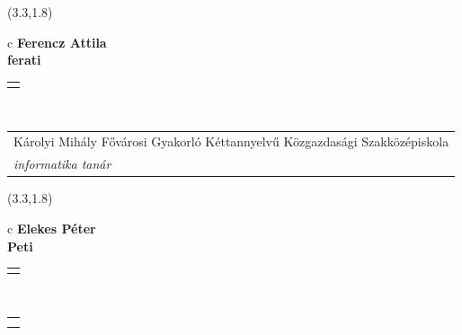 \documentclass[11pt]{article}
\begin{document}
\makebox(3.3,1.8){
  \renewcommand\arraystretch{1.3}
  \begin{tabular}[c]{c}
    \hspace{8.5mm}
    \LARGE\bf{ Ferencz Attila }\\
    \hspace{8.5mm}
    \Large{ ferati }\\
    \renewcommand\arraystretch{3}
    \begin{tabular}[c]{c}
      \centering
      \fontfamily{phv}\selectfont{
        \textbf{
          \textsc{
            \scriptsize{
            \color{Bright}{ Ismerkedő }\color{Dark}{ Webmester }\color{Bright}{ Sminkmester }\color{Bright}{ Programozó }
            }
          }
        }
      }
    \end{tabular}
    \\
    \renewcommand\arraystretch{1}
    \hspace{.5cm}
    \begin{tabular}{p{3in}}
      \footnotesize{Károlyi Mihály Fővárosi Gyakorló Kéttannyelvű Közgazdasági Szakközépiskola}\\
      \emph{informatika tanár}\\
    \end{tabular}
  \end{tabular}
}

\makebox(3.3,1.8){
  \renewcommand\arraystretch{1.3}
  \begin{tabular}[c]{c}
    \hspace{8.5mm}
    \LARGE\bf{ Elekes Péter }\\
    \hspace{8.5mm}
    \Large{ Peti }\\
    \renewcommand\arraystretch{3}
    \begin{tabular}[c]{c}
      \centering
      \fontfamily{phv}\selectfont{
        \textbf{
          \textsc{
            \scriptsize{
            \color{Dark}{ Ismerkedő }\color{Bright}{ Webmester }\color{Bright}{ Sminkmester }\color{Bright}{ Programozó }
            }
          }
        }
      }
    \end{tabular}
    \\
    \renewcommand\arraystretch{1}
    \begin{tabular}{p{3.3in}}
      \hspace{.7cm}\\
      \hspace{.7cm}\emph{  }\\
    \end{tabular}
  \end{tabular}
}
\end{document}
